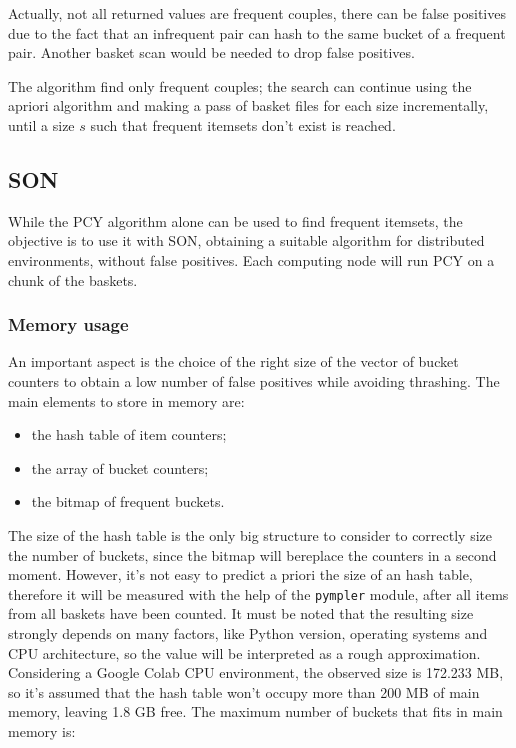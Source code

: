 \documentclass{article}
\begin{document}
Actually, not all returned values are frequent couples, there can be false positives due to the fact that an infrequent pair can hash to the same bucket of a frequent pair. Another basket scan would be needed to drop false positives.

The algorithm find only frequent couples; the search can continue using the apriori algorithm and making a pass of basket files for each size incrementally, until a size $s$ such that frequent itemsets don't exist is reached.

\subsection{SON}

While the PCY algorithm alone can be used to find frequent itemsets, the objective is to use it with SON, obtaining a suitable algorithm for distributed environments, without false positives. Each computing node will run PCY on a chunk of the baskets.

\subsubsection{Memory usage}

An important aspect is the choice of the right size of the vector of bucket counters to obtain a low number of false positives while avoiding thrashing.
The main elements to store in memory are:
\begin{itemize}
	\item the hash table of item counters;
	\item the array of bucket counters;
	\item the bitmap of frequent buckets.
\end{itemize}
The size of the hash table is the only big structure to consider to correctly size the number of buckets, since the bitmap will bereplace the counters in a second moment. 
However, it's not easy to predict a priori the size of an hash table, therefore it will be measured with the help of the \texttt{pympler} module, after all items from all baskets have been counted. It must be noted that the resulting size strongly depends on many factors, like Python version, operating systems and CPU architecture, so the value will be interpreted as a rough approximation. Considering a Google Colab CPU environment, the observed size is 172.233 MB, so it's assumed that the hash table won't occupy more than 200 MB of main memory, leaving 1.8 GB free. The maximum number of buckets that fits in main memory is:
\end{document}
